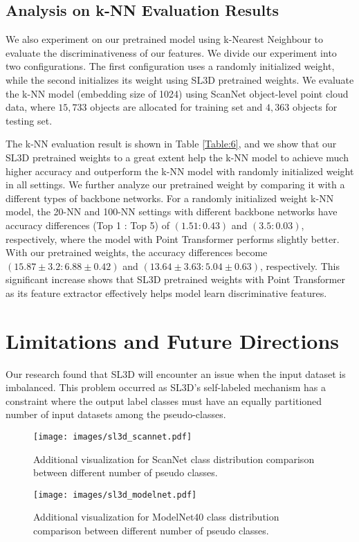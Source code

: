 \documentclass{article}
\begin{document}
\subsection{Analysis on k-NN Evaluation Results}

We also experiment on our pretrained model using k-Nearest Neighbour to evaluate the discriminativeness of our features. We divide our experiment into two configurations. The first configuration uses a randomly initialized weight, while the second  initializes its weight using SL3D pretrained weights. We evaluate the k-NN model (embedding size of 1024) using ScanNet object-level point cloud data, where $15,733$ objects are allocated for training set and $4,363$ objects for testing set.
 
The k-NN evaluation result is shown in Table \ref{Table:6}, and we show that our SL3D pretrained weights to a great extent help the k-NN model to achieve much higher accuracy and outperform the k-NN model with randomly initialized weight in all settings. We further analyze our pretrained weight by comparing it with a different types of backbone networks. For a randomly initialized weight k-NN model, the 20-NN and 100-NN settings with different backbone networks have accuracy differences (Top 1 : Top 5) of $(1.51:0.43)$ and $(3.5:0.03)$, respectively, where the model with Point Transformer performs slightly better. With our pretrained weights, the accuracy differences become $(15.87 \pm 3.2:6.88 \pm 0.42)$ and $(13.64 \pm 3.63:5.04 \pm 0.63)$, respectively. This significant increase shows that SL3D pretrained weights with Point Transformer as its feature extractor effectively helps model learn discriminative features.

\section{Limitations and Future Directions}
\label{sec:limit}
Our research found that SL3D will encounter an issue when the input dataset is imbalanced. This problem occurred as SL3D's self-labeled mechanism has a constraint where the output label classes must have an equally partitioned number of input datasets among the pseudo-classes. 

\begin{figure*}[ht]
\label{fig:3}
\texttt{[image: images/sl3d\_scannet.pdf]}
\caption{Additional visualization for ScanNet class distribution comparison between different number of pseudo classes.}
\end{figure*}

\begin{figure*}[ht]
\label{fig:4}
\texttt{[image: images/sl3d\_modelnet.pdf]}
\caption{Additional visualization for ModelNet40 class distribution comparison between different number of pseudo classes.}
\end{figure*}
\end{document}
